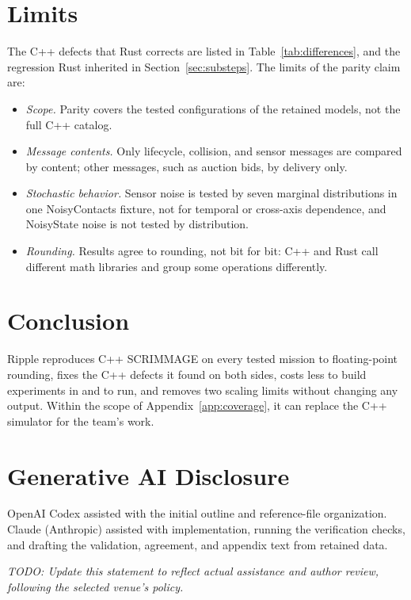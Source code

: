 \documentclass[conference]{IEEEtran}
\newcommand{\stub}[1]{\par\noindent\textit{TODO: #1}\par}
\begin{document}

\section{Limits}
\label{sec:discussion}


The C++ defects that Rust corrects are listed in Table~\ref{tab:differences},
and the regression Rust inherited in Section~\ref{sec:substeps}. The limits of
the parity claim are:
\begin{itemize}
\item \emph{Scope.} Parity covers the tested configurations of the retained
models, not the full C++ catalog.
\item \emph{Message contents.} Only lifecycle, collision, and sensor messages
are compared by content; other messages, such as auction bids, by delivery only.
\item \emph{Stochastic behavior.} Sensor noise is tested by seven marginal
distributions in one NoisyContacts fixture, not for temporal or cross-axis
dependence, and NoisyState noise is not tested by distribution.
\item \emph{Rounding.} Results agree to rounding, not bit for bit: C++ and Rust
call different math libraries and group some operations differently.
\end{itemize}

\section{Conclusion}

Ripple reproduces C++ SCRIMMAGE on every tested mission to
floating-point rounding, fixes the C++ defects it found on both sides, costs
less to build experiments in and to run, and removes two scaling limits without
changing any output. Within the scope of Appendix~\ref{app:coverage}, it can
replace the C++ simulator for the team's work.

\section*{Generative AI Disclosure}

OpenAI Codex assisted with the initial outline and reference-file
organization. Claude (Anthropic) assisted with implementation, running the
verification checks, and drafting the validation, agreement, and appendix text
from retained data. \stub{Update this statement to reflect actual assistance and
author review, following the selected venue's policy.}
\end{document}
